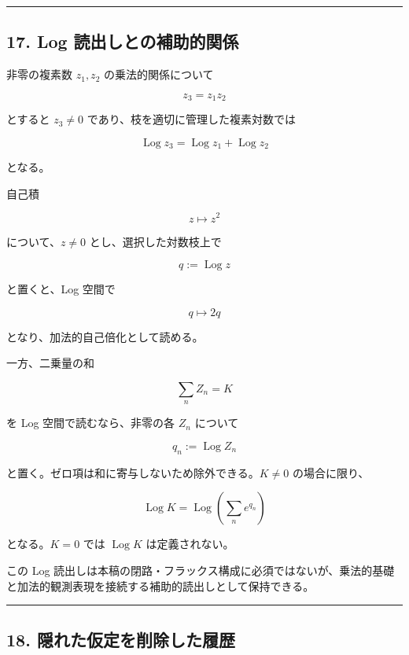 \documentclass[
  a4paper,
]{ltjsarticle}
\begin{document}
\begin{center}\rule{0.5\linewidth}{0.5pt}\end{center}

\subsection{17. Log
読出しとの補助的関係}\label{log-ux8aadux51faux3057ux3068ux306eux88dcux52a9ux7684ux95a2ux4fc2}

非零の複素数 \(z_1,z_2\) の乗法的関係について

\[
z_3=z_1z_2
\]

とすると \(z_3\neq0\) であり、枝を適切に管理した複素対数では

\[
\operatorname{Log} z_3=\operatorname{Log} z_1+\operatorname{Log} z_2
\]

となる。

自己積

\[
z\mapsto z^2
\]

について、\(z\neq0\) とし、選択した対数枝上で

\[
q:=\operatorname{Log}z
\]

と置くと、Log 空間で

\[
q\mapsto 2q
\]

となり、加法的自己倍化として読める。

一方、二乗量の和

\[
\sum_n Z_n=K
\]

を Log 空間で読むなら、非零の各 \(Z_n\) について

\[
q_n:=\operatorname{Log}Z_n
\]

と置く。ゼロ項は和に寄与しないため除外できる。\(K\neq0\) の場合に限り、

\[
\operatorname{Log} K=\operatorname{Log}\left(\sum_n e^{q_n}\right)
\]

となる。\(K=0\) では \(\operatorname{Log}K\) は定義されない。

この Log
読出しは本稿の閉路・フラックス構成に必須ではないが、乗法的基礎と加法的観測表現を接続する補助的読出しとして保持できる。

\begin{center}\rule{0.5\linewidth}{0.5pt}\end{center}

\subsection{18.
隠れた仮定を削除した履歴}\label{ux96a0ux308cux305fux4eeeux5b9aux3092ux524aux9664ux3057ux305fux5c65ux6b74}
\end{document}
